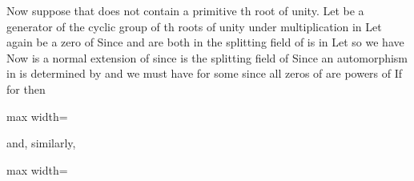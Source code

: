 \documentclass[11pt,oneside]{article}
\begin{document}
\begin{BookBody}
Now suppose that  does not contain a primitive th root of unity. Let \BookInline{\zeta } be a generator of the cyclic group of th roots of unity under multiplication in  Let \BookInline{\beta } again be a zero of  Since \BookInline{\beta } and \BookInline{\zeta \beta } are both in the splitting field  of  \BookInline{(\zeta \beta )/\beta } is in  Let  so we have  Now  is a normal extension of  since  is the splitting field of  Since  an automorphism \BookInline{\eta } in  is determined by \BookInline{\eta (\zeta ),\allowbreak } and we must have  for some  since all zeros of  are powers of  If  for  then

\begin{center}\begin{adjustbox}{max width=\linewidth}\end{adjustbox}\end{center}

\noindent and, similarly,

\begin{center}\begin{adjustbox}{max width=\linewidth}\end{adjustbox}\end{center}

\end{BookBody}

\BookNarrativetrue
\end{document}
